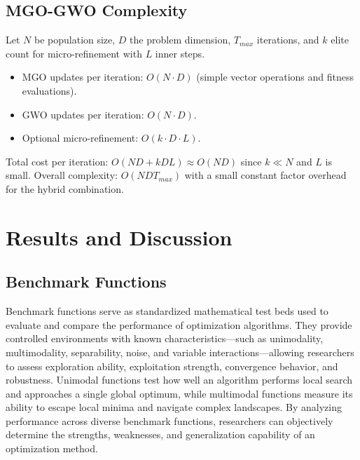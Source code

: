 \documentclass[12pt,a4paper]{article}
\begin{document}
\subsection{MGO-GWO Complexity}

Let $N$ be population size, $D$ the problem dimension, $T_{max}$ iterations, and $k$ elite count for micro-refinement with $L$ inner steps.

\begin{itemize}
  \item MGO updates per iteration: $O(N \cdot D)$ (simple vector operations and fitness evaluations).
  \item GWO updates per iteration: $O(N \cdot D)$.
  \item Optional micro-refinement: $O(k \cdot D \cdot L)$.
\end{itemize}
Total cost per iteration: $O(ND + kDL) \approx O(ND)$ since $k \ll N$ and $L$ is small. Overall complexity: $O(N D T_{max})$ with a small constant factor overhead for the hybrid combination.

\section{Results and Discussion}

\subsection{Benchmark Functions}

Benchmark functions serve as standardized mathematical test beds used to evaluate and compare the performance of optimization algorithms. They provide controlled environments with known characteristics—such as unimodality, multimodality, separability, noise, and variable interactions—allowing researchers to assess exploration ability, exploitation strength, convergence behavior, and robustness. Unimodal functions test how well an algorithm performs local search and approaches a single global optimum, while multimodal functions measure its ability to escape local minima and navigate complex landscapes. By analyzing performance across diverse benchmark functions, researchers can objectively determine the strengths, weaknesses, and generalization capability of an optimization method.
\end{document}
